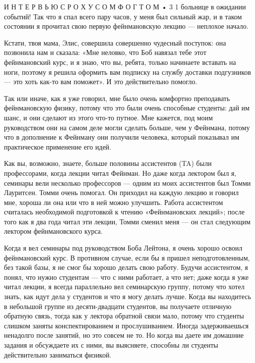 \documentclass[11pt,oneside]{article}
\begin{document}
И Н Т Е Р В Ь Ю  С  Р О Х У С О М  Ф О Г Т О М • 3 1 больнице в ожидании событий! Так что я спал всего пару часов, у меня был сильный жар, и в таком состоянии я прочитал свою первую фейнмановскую лекцию --- неплохое начало.\par



Кстати, твоя мама, Элис, совершила совершенно чудесный поступок: она позвонила нам и сказала: «Мне неловко, что Боб навязал тебе этот фейнмановский курс, и я знаю, что вы, ребята, только начинаете вставать на ноги, поэтому я решила оформить вам подписку на службу доставки подгузников --- это хоть как-то вам поможет». И это действительно помогло.\par



Так или иначе, как я уже говорил, мне было очень комфортно преподавать фейнмановскую физику, потому что это были очень способные студенты: дай им шанс, и они сделают из этого что-то путное. Мне кажется, под моим руководством они на самом деле могли сделать больше, чем у Фейнмана, потому что в дополнение к Фейнману они получили человека, который показывал им практическое применение его идей.\par



Как вы, возможно, знаете, больше половины ассистентов (TA) были профессорами, когда лекции читал Фейнман. Но даже когда лектором был я, семинары вели несколько профессоров --- одним из моих ассистентов был Томми Лауритсен. Томми очень помогал. Он приходил на каждую лекцию и говорил мне, хороша ли она или что в ней можно улучшить. Работа ассистентом считалась необходимой подготовкой к чтению «Фейнмановских лекций»; после того как я два года читал эти лекции, Томми сменил меня --- он стал следующим лектором фейнмановского курса.\par



Когда я вел семинары под руководством Боба Лейтона, я очень хорошо освоил фейнмановский курс. В противном случае, если бы я пришел неподготовленным, без такой базы, я не смог бы хорошо делать свою работу. Будучи ассистентом, я понял, что нужно студентам --- что с ними работает, а что нет; даже когда я уже читал лекции, я всегда параллельно вел семинарскую группу, потому что хотел знать, как идут дела у студентов и что я могу делать лучше. Когда вы находитесь в небольшой группе из десяти-двадцати студентов, вы получаете отличную обратную связь, тогда как у лектора обратной связи мало, потому что студенты слишком заняты конспектированием и прослушиванием. Иногда задерживаешься ненадолго после занятий, но это совсем не то. Но когда вы даете им домашние задания и обсуждаете их с ними, вы выясняете, способны ли студенты действительно заниматься физикой.\par
\end{document}
